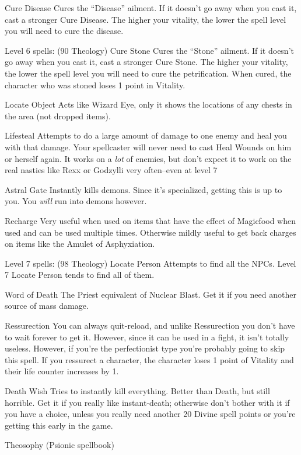 \documentclass[12pt]{article}
\begin{document}
Cure Disease Cures the ``Disease'' ailment. If it doesn't go away when
you cast it, cast a stronger Cure Disease. The higher your vitality, the
lower the spell level you will need to cure the disease.

Level 6 spells: (90 Theology) Cure Stone Cures the ``Stone'' ailment. If
it doesn't go away when you cast it, cast a stronger Cure Stone. The
higher your vitality, the lower the spell level you will need to cure
the petrification. When cured, the character who was stoned loses 1
point in Vitality.

Locate Object Acts like Wizard Eye, only it shows the locations of any
chests in the area (not dropped items).

Lifesteal Attempts to do a large amount of damage to one enemy and heal
you with that damage. Your spellcaster will never need to cast Heal
Wounds on him or herself again. It works on a \emph{lot} of enemies, but
don't expect it to work on the real nasties like Rexx or Godzylli very
often--even at level 7

Astral Gate Instantly kills demons. Since it's specialized, getting this
is up to you. You \emph{will} run into demons however.

Recharge Very useful when used on items that have the effect of
Magicfood when used and can be used multiple times. Otherwise mildly
useful to get back charges on items like the Amulet of Asphyxiation.

Level 7 spells: (98 Theology) Locate Person Attempts to find all the
NPCs. Level 7 Locate Person tends to find all of them.

Word of Death The Priest equivalent of Nuclear Blast. Get it if you need
another source of mass damage.

Ressurection You can always quit-reload, and unlike Ressurection you
don't have to wait forever to get it. However, since it can be used in a
fight, it isn't totally useless. However, if you're the perfectionist
type you're probably going to skip this spell. If you ressurect a
character, the character loses 1 point of Vitality and their life
counter increases by 1.

Death Wish Tries to instantly kill everything. Better than Death, but
still horrible. Get it if you really like instant-death; otherwise don't
bother with it if you have a choice, unless you really need another 20
Divine spell points or you're getting this early in the game.

Theosophy (Psionic spellbook)
\end{document}
